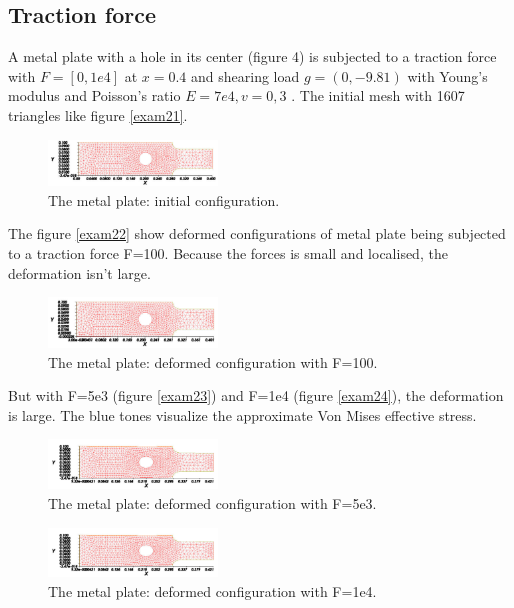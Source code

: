 \documentclass[notitlepage,a4paper,fleqn,9pt]{icmfarticle}
\begin{document}
\begin{multicols}{2}
\subsection{Traction force}
A metal plate with a hole in its center (figure 4) is subjected to a traction force with $F=[0,1e4]$ at $x=0.4$ and shearing load $g=(0,-9.81)$ with Young's modulus and Poisson's ratio $E=7e4, v=0,3$ \cite{TIT-07}. The initial mesh with 1607 triangles like figure \eqref{exam21}.
\begin{figure}[H]
  \begin{center}
    \includegraphics[width=0.4\textwidth]{4-2-1.pdf}
  \end{center}
  \caption{The metal plate: initial configuration.}
  \label{exam21}
\end{figure}
The figure \eqref{exam22} show deformed configurations of metal plate being subjected to a traction force F=100. Because the forces is small and localised, the deformation isn't large.
\begin{figure}[H]
  \begin{center}
    \includegraphics[width=0.4\textwidth]{4-2-2.pdf}
  \end{center}
  \caption{The metal plate: deformed configuration with F=100.}
  \label{exam22}
\end{figure}
But with F=5e3 (figure \eqref{exam23}) and F=1e4 (figure \eqref{exam24}), the deformation is large. The blue tones visualize the approximate Von Mises effective stress.
\begin{figure}[H]
  \begin{center}
    \includegraphics[width=0.4\textwidth]{4-2-3.pdf}
  \end{center}
  \caption{The metal plate: deformed configuration with F=5e3.}
  \label{exam23}
\end{figure}
\begin{figure}[H]
  \begin{center}
    \includegraphics[width=0.4\textwidth]{4-2-3.pdf}
  \end{center}
  \caption{The metal plate: deformed configuration with F=1e4.}
  \label{exam24}
\end{figure}

\end{multicols}
\end{document}
